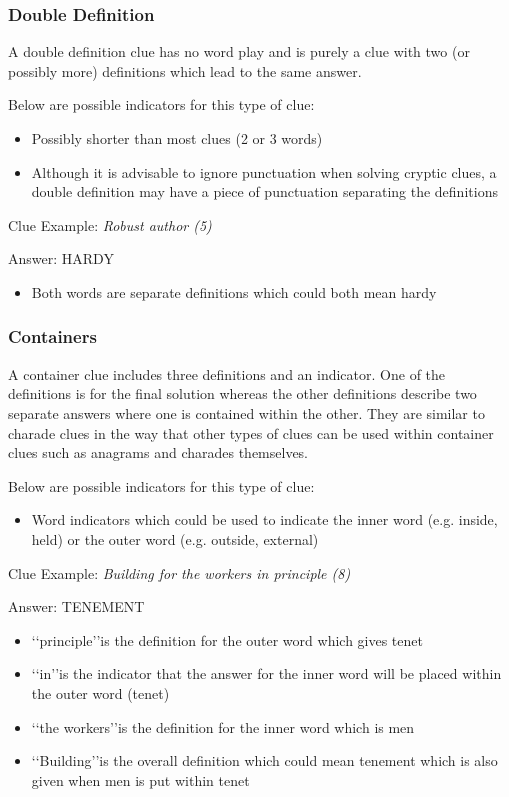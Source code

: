 \subsubsection{Double Definition}

A double definition clue has no word play and is purely a clue with two (or possibly more) definitions which lead to the same answer. 

Below are possible indicators for this type of clue:
\begin{itemize} 
	\item Possibly shorter than most clues (2 or 3 words) 
	\item Although it is advisable to ignore punctuation when solving cryptic clues, a double definition may have a piece of punctuation separating the definitions 
\\
\end{itemize}

Clue Example: \emph{Robust author (5)} 

Answer: HARDY 

\begin{itemize}
	\item Both words are separate definitions which could both mean hardy 
\end{itemize}

\subsubsection{Containers}

A container clue includes three definitions and an indicator. One of the definitions is for the final solution whereas the other definitions describe two separate answers where one is contained within the other. They are similar to charade clues in the way that other types of clues can be used within container clues such as anagrams and charades themselves.  

Below are possible indicators for this type of clue:
\begin{itemize} 
	\item Word indicators which could be used to indicate the inner word (e.g. inside, held) or the outer word (e.g. outside, external)
\\
\end{itemize}

Clue Example: \emph{Building for the workers in principle (8)}  

Answer: TENEMENT 

\begin{itemize}
	\item \lq\lq principle\rq\rq is the definition for the outer word which gives tenet 
	\item \lq\lq in\rq\rq is the indicator that the answer for the inner word will be placed within the outer word (tenet) 
	\item \lq\lq the workers\rq\rq is the definition for the inner word which is men 
	\item \lq\lq Building\rq\rq is the overall definition which could mean tenement which is also given when men is put within tenet 
\end{itemize}

